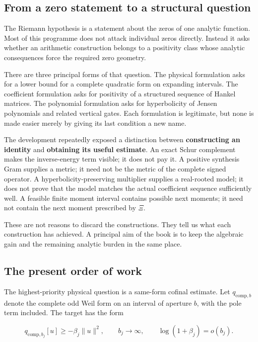 \documentclass[
  10pt,
  a4paper,
  10pt,
  oneside,
  openany]{book}
\begin{document}
\subsection{From a zero statement to a structural
question}\label{from-a-zero-statement-to-a-structural-question}

The Riemann hypothesis is a statement about the zeros of one analytic
function. Most of this programme does not attack individual zeros
directly. Instead it asks whether an arithmetic construction belongs to
a positivity class whose analytic consequences force the required zero
geometry.

There are three principal forms of that question. The physical
formulation asks for a lower bound for a complete quadratic form on
expanding intervals. The coefficient formulation asks for positivity of
a structured sequence of Hankel matrices. The polynomial formulation
asks for hyperbolicity of Jensen polynomials and related vertical gates.
Each formulation is legitimate, but none is made easier merely by giving
its last condition a new name.

The development repeatedly exposed a distinction between
\textbf{constructing an identity} and \textbf{obtaining its useful
estimate}. An exact Schur complement makes the inverse-energy term
visible; it does not pay it. A positive synthesis Gram supplies a
metric; it need not be the metric of the complete signed operator. A
hyperbolicity-preserving multiplier supplies a real-rooted model; it
does not prove that the model matches the actual coefficient sequence
sufficiently well. A feasible finite moment interval contains possible
next moments; it need not contain the next moment prescribed by \(\Xi\).

These are not reasons to discard the constructions. They tell us what
each construction has achieved. A principal aim of the book is to keep
the algebraic gain and the remaining analytic burden in the same place.

\subsection{The present order of work}\label{the-present-order-of-work}

The highest-priority physical question is a same-form cofinal estimate.
Let \(q_{\mathrm{comp},b}\) denote the complete odd Weil form on an
interval of aperture \(b\), with the pole term included. The target has
the form

\[
q_{\mathrm{comp},b_j}[u]\ge-\beta_j\|u\|^2,
\qquad b_j\longrightarrow\infty,
\qquad \log(1+\beta_j)=o(b_j).
\tag{1.1}\label{eq:1.1}
\]
\end{document}
